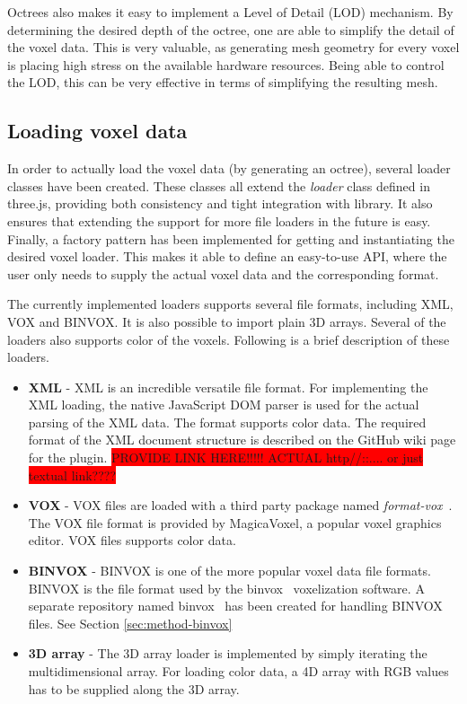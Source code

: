 Octrees also makes it easy to implement a Level of Detail (LOD) mechanism. By determining the desired depth of the octree, one are able to simplify the detail of the voxel data. This is very valuable, as generating mesh geometry for every voxel is placing high stress on the available hardware resources. Being able to control the LOD, this can be very effective in terms of simplifying the resulting mesh.

\subsection{Loading voxel data}
In order to actually load the voxel data (by generating an octree), several loader classes have been created. These classes all extend the \textit{loader} class defined in three.js, providing both consistency and tight integration with library. It also ensures that extending the support for more file loaders in the future is easy. Finally, a factory pattern has been implemented for getting and instantiating the desired voxel loader. This makes it able to define an easy-to-use API, where the user only needs to supply the actual voxel data and the corresponding format.

The currently implemented loaders supports several file formats, including XML, VOX and BINVOX. It is also possible to import plain 3D arrays. Several of the loaders also supports color of the voxels. Following is a brief description of these loaders.
\begin{itemize}
    \item \textbf{XML} - XML is an incredible versatile file format. For implementing the XML loading, the native JavaScript DOM parser is used for the actual parsing of the XML data. The format supports color data. The required format of the XML document structure is described on the GitHub wiki page for the plugin. \colorbox{red}{PROVIDE LINK HERE!!!!! ACTUAL http//::.... or just textual link????}
    \item \textbf{VOX} - VOX files are loaded with a third party package named \textit{format-vox}~\cite{format-vox}. The VOX file format is provided by MagicaVoxel, a popular voxel graphics editor. VOX files supports color data.
    \item \textbf{BINVOX} - BINVOX \cite{binvox-file-format} is one of the more popular voxel data file formats. BINVOX is the file format used by the binvox~\cite{binvox} voxelization software. A separate repository named binvox~\cite{andstor-binvox} has been created for handling BINVOX files. See Section \ref{sec:method-binvox}
    \item \textbf{3D array} - The 3D array loader is implemented by simply iterating the multidimensional array. For loading color data, a 4D array with RGB values has to be supplied along the 3D array.
\end{itemize}

